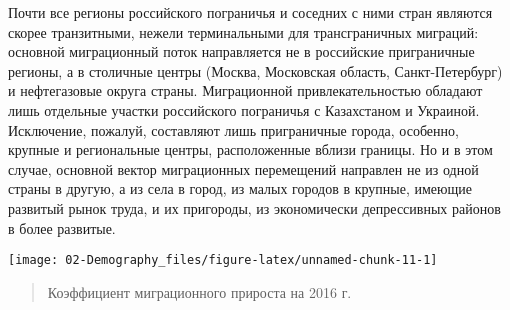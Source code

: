 \documentclass[]{book}
\begin{document}
Почти все регионы российского пограничья и соседних с ними стран
являются скорее транзитными, нежели терминальными для трансграничных
миграций: основной миграционный поток направляется не в российские
приграничные регионы, а в столичные центры (Москва, Московская область,
Санкт-Петербург) и нефтегазовые округа страны. Миграционной
привлекательностью обладают лишь отдельные участки российского
пограничья с Казахстаном и Украиной. Исключение, пожалуй, составляют
лишь приграничные города, особенно, крупные и региональные центры,
расположенные вблизи границы. Но и в этом случае, основной вектор
миграционных перемещений направлен не из одной страны в другую, а из
села в город, из малых городов в крупные, имеющие развитый рынок труда,
и их пригороды, из экономически депрессивных районов в более развитые.

\texttt{[image: 02-Demography\_files/figure-latex/unnamed-chunk-11-1]}

\begin{quote}
Коэффициент миграционного прироста на 2016 г.
\end{quote}


\end{document}
